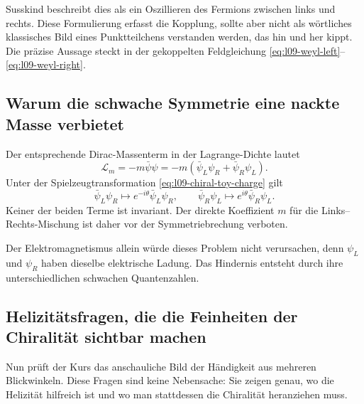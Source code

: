 Susskind beschreibt dies als ein Oszillieren des Fermions zwischen links und rechts. Diese Formulierung erfasst die Kopplung, sollte aber nicht als wörtliches klassisches Bild eines Punktteilchens verstanden werden, das hin und her kippt. Die präzise Aussage steckt in der gekoppelten Feldgleichung \eqref{eq:l09-weyl-left}--\eqref{eq:l09-weyl-right}.

\begin{classroomqa}
\end{classroomqa}

\subsection{Warum die schwache Symmetrie eine nackte Masse verbietet}

Der entsprechende Dirac-Massenterm in der Lagrange-Dichte lautet
\begin{equation}
  \mathcal L_m
  =-m\bar\psi\psi
  =-m\left(\bar\psi_L\psi_R+\bar\psi_R\psi_L\right).
  \label{eq:l09-bare-dirac-mass}
\end{equation}
Unter der Spielzeugtransformation \eqref{eq:l09-chiral-toy-charge} gilt
\begin{equation}
  \bar\psi_L\psi_R\longmapsto
  e^{-i\theta}\bar\psi_L\psi_R,
  \qquad
  \bar\psi_R\psi_L\longmapsto
  e^{i\theta}\bar\psi_R\psi_L.
\end{equation}
Keiner der beiden Terme ist invariant. Der direkte Koeffizient \(m\) für die Links--Rechts-Mischung ist daher vor der Symmetriebrechung verboten.

Der Elektromagnetismus allein würde dieses Problem nicht verursachen, denn \(\psi_L\) und \(\psi_R\) haben dieselbe elektrische Ladung. Das Hindernis entsteht durch ihre unterschiedlichen schwachen Quantenzahlen.

\subsection{Helizitätsfragen, die die Feinheiten der Chiralität sichtbar machen}

Nun prüft der Kurs das anschauliche Bild der Händigkeit aus mehreren Blickwinkeln. Diese Fragen sind keine Nebensache: Sie zeigen genau, wo die Helizität hilfreich ist und wo man stattdessen die Chiralität heranziehen muss.


